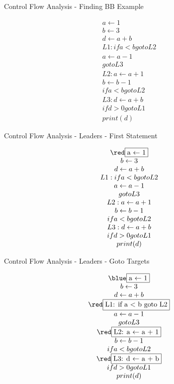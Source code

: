 \documentclass[mcgill,slideColor,colorBG,pdf]{prosper}
\begin{document}
\begin{slide} {Control Flow Analysis - Finding BB Example}
\begin{tiny}
$$
\begin{array}{c}
a \leftarrow 1\\
b \leftarrow 3\\
d \leftarrow a + b\\
L1: if a < b goto L2\\
a \leftarrow a - 1\\
goto L3\\
L2: a \leftarrow a + 1\\
b \leftarrow b - 1\\
if a < b goto L2\\
L3: d \leftarrow a + b\\
if d > 0 goto L1\\
print (d)
\end{array}
$$
\end{tiny}
\end{slide}

\begin{slide} {Control Flow Analysis - Leaders - First Statement}
\begin{tiny}
$$
\begin{array}{c}
{\red \fbox{a $\leftarrow$ 1}}\\
b \leftarrow 3\\
d \leftarrow a + b\\
L1: if a < b goto L2\\
a \leftarrow a - 1\\
goto L3\\
L2: a \leftarrow a + 1\\
b \leftarrow b - 1\\
if a < b goto L2\\
L3: d \leftarrow a + b\\
if d > 0 goto L1\\
print (d)
\end{array}
$$
\end{tiny}
\end{slide}

\begin{slide} {Control Flow Analysis - Leaders - Goto Targets}
\begin{tiny}
$$
\begin{array}{c}
{\blue \fbox{a $\leftarrow$ 1}}\\
b \leftarrow 3\\
d \leftarrow a + b\\
{\red \fbox{L1: if a < b goto L2}}\\
a \leftarrow a - 1\\
goto L3\\
{\red \fbox{L2: a $\leftarrow$ a + 1}}\\
b \leftarrow b - 1\\
if a < b goto L2\\
{\red \fbox{L3: d $\leftarrow$ a + b}}\\
if d > 0 goto L1\\
print (d)
\end{array}
$$
\end{tiny}
\end{slide}
\end{document}
